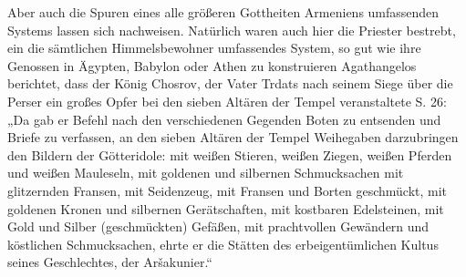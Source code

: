 \documentclass{article}
\begin{document}
Aber auch die Spuren eines alle größeren Gottheiten Armeniens umfassenden Systems lassen sich nachweisen. Natürlich waren auch hier die Priester bestrebt, ein die sämtlichen Himmelsbewohner umfassendes System, so gut wie ihre Genossen in Ägypten, Babylon oder Athen zu konstruieren Agathangelos berichtet, dass der König Chosrov, der Vater Trdats nach seinem Siege über die Perser ein großes Opfer bei den sieben Altären der Tempel veranstaltete S. 26: „Da gab er Befehl nach den verschiedenen Gegenden Boten zu entsenden und Briefe zu verfassen, an den sieben Altären der Tempel Weihegaben darzubringen den Bildern der Götteridole: mit weißen Stieren, weißen Ziegen, weißen Pferden und weißen Mauleseln, mit goldenen und silbernen Schmucksachen mit glitzernden Fransen, mit Seidenzeug, mit Fransen und Borten geschmückt, mit goldenen Kronen und silbernen Gerätschaften, mit kostbaren Edelsteinen, mit Gold und Silber (geschmückten) Gefäßen, mit prachtvollen Gewändern und köstlichen Schmucksachen, ehrte er die Stätten des erbeigentümlichen Kultus seines Geschlechtes, der Aršakunier.“
\end{document}
